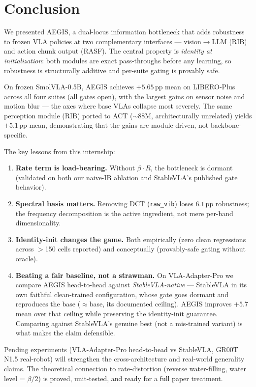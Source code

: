 \documentclass[11pt,a4paper]{article}
\begin{document}
\section{Conclusion}
\label{sec:conclusion}

We presented AEGIS, a dual-locus information bottleneck that adds robustness to frozen
VLA policies at two complementary interfaces — vision$\to$LLM (RIB) and action chunk
output (RASF). The central property is \emph{identity at initialization}: both modules are
exact pass-throughs before any learning, so robustness is structurally additive and
per-suite gating is provably safe.

On frozen SmolVLA-0.5B, AEGIS achieves $+5.65$\,pp mean on LIBERO-Plus across all four
suites (all gates open), with the largest gains on sensor noise and motion blur
— the axes where base VLAs collapse most severely. The same perception module (RIB) ported to ACT ($\sim$88M,
architecturally unrelated) yields $+5.1$\,pp mean, demonstrating that the gains are
module-driven, not backbone-specific.

The key lessons from this internship:
\begin{enumerate}[nosep]
  \item \textbf{Rate term is load-bearing.} Without $\beta\cdot R$, the bottleneck is dormant
        (validated on both our naive-IB ablation and StableVLA's published gate behavior).
  \item \textbf{Spectral basis matters.} Removing DCT (\texttt{raw\_vib}) loses $6.1$\,pp
        robustness; the frequency decomposition is the active ingredient, not mere
        per-band dimensionality.
  \item \textbf{Identity-init changes the game.} Both empirically (zero clean regressions
        across $>$150 cells reported) and conceptually (provably-safe gating without oracle).
  \item \textbf{Beating a fair baseline, not a strawman.} On VLA-Adapter-Pro we compare AEGIS
        head-to-head against \emph{StableVLA-native} — StableVLA in its own faithful clean-trained
        configuration, whose gate goes dormant and reproduces the base ($\approx$base, its
        documented ceiling). AEGIS improves $+5.7$ mean over that ceiling while preserving the
        identity-init guarantee. Comparing against StableVLA's genuine best (not a mis-trained
        variant) is what makes the claim defensible.
\end{enumerate}

Pending experiments (VLA-Adapter-Pro head-to-head vs StableVLA, GR00T N1.5 real-robot)
will strengthen the cross-architecture and real-world generality claims. The theoretical
connection to rate-distortion (reverse water-filling, water level = $\beta/2$) is proved,
unit-tested, and ready for a full paper treatment.
\end{document}
